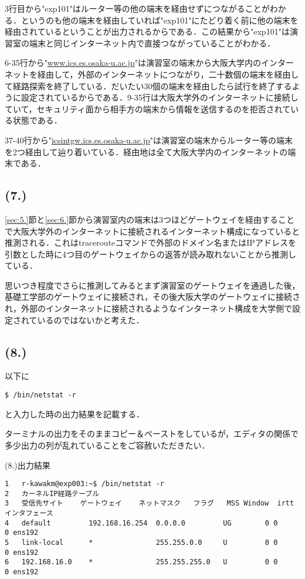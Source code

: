\documentclass[a4j]{jarticle}
\newenvironment{bit}{\begin{breakitembox}}{\end{breakitembox}} %
\begin{document}
3行目から"exp101"はルーター等の他の端末を経由せずにつながることがわかる．というのも他の端末を経由していれば"exp101"にたどり着く前に他の端末を経由されているということが出力されるからである．この結果から"exp101"は演習室の端末と同じインターネット内で直接つながっていることがわかる．

6-35行から"\url{www.ics.es.osaka-u.ac.jp}"は演習室の端末から大阪大学内のインターネットを経由して，外部のインターネットにつながり，二十数個の端末を経由して経路探索を終了している．だいたい30個の端末を経由したら試行を終了するように設定されているからである．9-35行は大阪大学外のインターネットに接続していて，セキュリティ面から相手方の端末から情報を送信するのを拒否されている状態である．

37-40行から"\url{icsintgw.ics.es.osaka-u.ac.jp}"は演習室の端末からルーター等の端末を2つ経由して辿り着いている．経由地は全て大阪大学内のインターネットの端末である．

\subsection{(7.)}
\label{sec:7.}

\ref{sec:5.}節と\ref{sec:6.}節から演習室内の端末は3つほどゲートウェイを経由することで大阪大学外のインターネットに接続されるインターネット構成になっていると推測される．これはtracerouteコマンドで外部のドメイン名またはIPアドレスを引数とした時に4つ目のゲートウェイからの返答が読み取れないことから推測している．

思いつき程度でさらに推測してみるとまず演習室のゲートウェイを通過した後，基礎工学部のゲートウェイに接続され，その後大阪大学のゲートウェイに接続され，外部のインターネットに接続されるようなインターネット構成を大学側で設定されているのではないかと考えた．

\subsection{(8.)}

以下に
\begin{verbatim}
$ /bin/netstat -r
\end{verbatim}
と入力した時の出力結果を記載する．

ターミナルの出力をそのままコピー＆ペーストをしているが，エディタの関係で多少出力の列が乱れていることをご容赦いただきたい．

\begin{bit}[l]{(8.)出力結果}
\small{
\begin{verbatim}
1	r-kawakm@exp003:~$ /bin/netstat -r
2	カーネルIP経路テーブル
3	受信先サイト    ゲートウェイ    ネットマスク   フラグ   MSS Window  irtt インタフェース
4	default         192.168.16.254  0.0.0.0         UG        0 0          0 ens192
5	link-local      *               255.255.0.0     U         0 0          0 ens192
6	192.168.16.0    *               255.255.255.0   U         0 0          0 ens192
\end{verbatim}
}
\end{bit}
\end{document}
